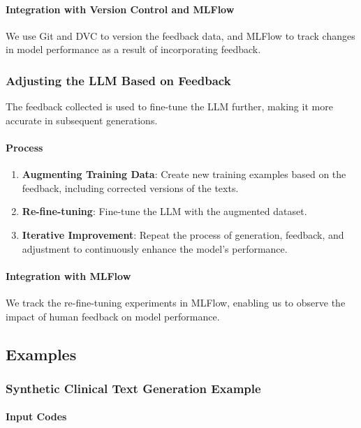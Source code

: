 \documentclass[12pt, a4paper]{article}
\begin{document}
\paragraph{Integration with Version Control and MLFlow}

We use Git and DVC to version the feedback data, and MLFlow to track changes in model performance as a result of incorporating feedback.

\subsubsection{Adjusting the LLM Based on Feedback}

The feedback collected is used to fine-tune the LLM further, making it more accurate in subsequent generations.

\paragraph{Process}

\begin{enumerate}
    \item \textbf{Augmenting Training Data}: Create new training examples based on the feedback, including corrected versions of the texts.
    \item \textbf{Re-fine-tuning}: Fine-tune the LLM with the augmented dataset.
    \item \textbf{Iterative Improvement}: Repeat the process of generation, feedback, and adjustment to continuously enhance the model's performance.
\end{enumerate}

\paragraph{Integration with MLFlow}

We track the re-fine-tuning experiments in MLFlow, enabling us to observe the impact of human feedback on model performance.

\subsection{Examples}

\subsubsection{Synthetic Clinical Text Generation Example}

\paragraph{Input Codes}
\end{document}

